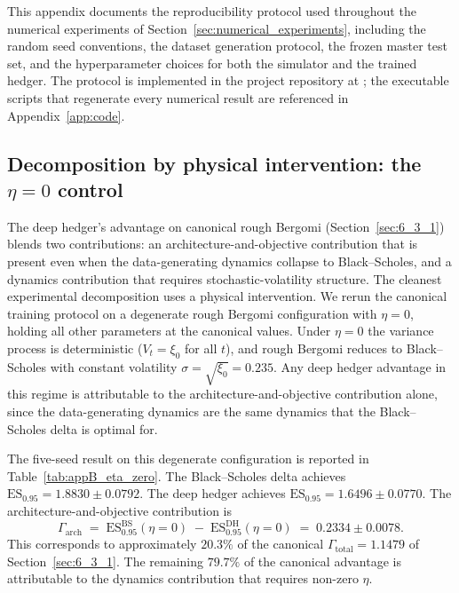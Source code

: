 \documentclass[12pt,a4paper]{article}
\theoremstyle{definition}
\theoremstyle{plain}
\theoremstyle{remark}
\theoremstyle{plain}
\begin{document}
This appendix documents the reproducibility protocol used throughout the
numerical experiments of Section~\ref{sec:numerical_experiments}, including
the random seed conventions, the dataset generation protocol, the frozen
master test set, and the hyperparameter choices for both the simulator and
the trained hedger. The protocol is implemented in the project repository at
; the executable scripts that
regenerate every numerical result are referenced in
Appendix~\ref{app:code}.

\subsection{Decomposition by physical intervention: the $\eta = 0$ control}
\label{app:eta_zero_control}

The deep hedger's advantage on canonical rough Bergomi
(Section~\ref{sec:6_3_1}) blends two contributions: an
architecture-and-objective contribution that is present even when the
data-generating dynamics collapse to Black--Scholes, and a
dynamics contribution that requires stochastic-volatility structure.
The cleanest experimental decomposition uses a physical intervention.
We rerun the canonical training protocol on a degenerate rough Bergomi
configuration with $\eta = 0$, holding all other parameters at the
canonical values. Under $\eta = 0$ the variance process is
deterministic ($V_t = \xi_0$ for all $t$), and rough Bergomi reduces
to Black--Scholes with constant volatility $\sigma = \sqrt{\xi_0} =
0.235$. Any deep hedger advantage in this regime is attributable to
the architecture-and-objective contribution alone, since the
data-generating dynamics are the same dynamics that the
Black--Scholes delta is optimal for.

The five-seed result on this degenerate configuration is reported in
Table~\ref{tab:appB_eta_zero}. The Black--Scholes delta achieves
$\mathrm{ES}_{0.95} = 1.8830 \pm 0.0792$. The deep hedger achieves
$\mathrm{ES}_{0.95} = 1.6496 \pm 0.0770$. The architecture-and-objective
contribution is
\[
\Gamma_{\mathrm{arch}} \;=\; \mathrm{ES}_{0.95}^{\mathrm{BS}}(\eta = 0) \;-\; \mathrm{ES}_{0.95}^{\mathrm{DH}}(\eta = 0) \;=\; 0.2334 \pm 0.0078.
\]
This corresponds to approximately $20.3\%$ of the canonical
$\Gamma_{\mathrm{total}} = 1.1479$ of Section~\ref{sec:6_3_1}. The
remaining $79.7\%$ of the canonical advantage is attributable to the
dynamics contribution that requires non-zero $\eta$.
\end{document}

